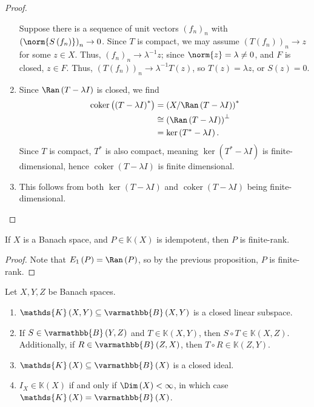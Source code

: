 \documentclass[10pt]{mypackage}
\renewcommand*{\mathbb}[1]{\varmathbb{#1}}
\newcommand{\B}{\mathbb{B}}
\begin{document}
\begin{proof}
\begin{enumerate}[(1)]
      Suppose there is a sequence of unit vectors $\left(f_n\right)_n$ with $\left(\norm{S\left(f_n\right)}\right)_{n}\rightarrow 0$. Since $T$ is compact, we may assume $\left(T\left(f_n\right)\right)_{n}\rightarrow z$ for some $z\in X$. Thus, $\left(f_n\right)_{n}\rightarrow \lambda^{-1}z$; since $\norm{z} = \lambda \neq 0$, and $F$ is closed, $z\in F$. Thus, $\left(T\left(f_n\right)\right)_{n}\rightarrow \lambda^{-1}T\left(z\right)$, so $T\left(z\right) = \lambda z$, or $S\left(z\right) = 0$.
    \item Since $\Ran\left(T-\lambda I\right)$ is closed, we find
      \begin{align*}
        \operatorname{coker}\left(\left(T-\lambda I\right)^{\ast}\right) &= \left(X/\Ran\left(T-\lambda I\right)\right)^{\ast}\\
                                                                         &\cong \left(\Ran\left(T-\lambda I\right)\right)^{\perp}\\
                                                                         &= \ker\left(T^{\ast}-\lambda I\right).
      \end{align*}
      Since $T$ is compact, $T^{\ast}$ is also compact, meaning $\ker\left(T^{\ast}-\lambda I\right)$ is finite-dimensional, hence $\operatorname{coker}\left(T-\lambda I\right)$ is finite dimensional.
    \item This follows from both $\ker\left(T-\lambda I\right)$ and $\operatorname{coker}\left(T-\lambda I\right)$ being finite-dimensional.
  \end{enumerate}
\end{proof}
\begin{corollary}
  If $X$ is a Banach space, and $P\in \mathds{K}(X)$ is idempotent, then $P$ is finite-rank.
\end{corollary}
\begin{proof}
  Note that $E_{1}\left(P\right) = \Ran\left(P\right)$, so by the previous proposition, $P$ is finite-rank.
\end{proof}
\begin{theorem}
  Let $X,Y,Z$ be Banach spaces.
  \begin{enumerate}[(1)]
    \item $\mathds{K}\left(X,Y\right)\subseteq \B\left(X,Y\right)$ is a closed linear subspace.
    \item If $S\in \B\left(Y,Z\right)$ and $T\in \mathds{K}\left(X,Y\right)$, then $S\circ T\in \mathds{K}\left(X,Z\right)$. Additionally, if $R\in \B\left(Z,X\right)$, then $T\circ R\in \mathds{K}\left(Z,Y\right)$.
    \item $\mathds{K}\left(X\right)\subseteq \B\left(X\right)$ is a closed ideal.
    \item $I_{X}\in \mathds{K}\left(X\right)$ if and only if $\Dim\left(X\right) < \infty$, in which case $\mathds{K}\left(X\right) = \B\left(X\right)$.
  \end{enumerate}
\end{theorem}
\end{document}
